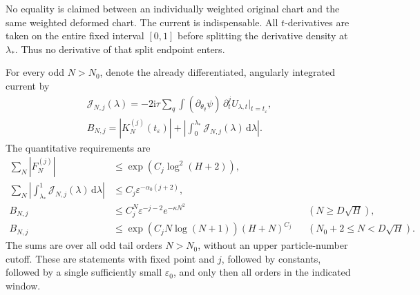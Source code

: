 \documentclass[11pt]{article}
\numberwithin{equation}{section}
\theoremstyle{definition}
\newcommand{\dd}{\,\mathrm d}
\newcommand{\ii}{\mathrm i}
\newcommand{\eps}{\varepsilon}
\begin{document}
No equality is claimed between an individually weighted original chart
and the same weighted deformed chart. The current is indispensable.
All \(t\)-derivatives are taken on the entire fixed interval
\([0,1]\) before splitting the derivative density at \(\lambda_*\).
Thus no derivative of that split endpoint enters.

For every odd $N>N_0$, denote the already differentiated,
angularly integrated current by
\begin{gather*}
 \mathcal J_{N,j}(\lambda)
   =-2\ii\tau\sum_q\int(\partial_{\theta_q}\psi)\,
              \partial_t^j U_{\lambda,t}\big|_{t=t_\eps},\\
 B_{N,j}=|K_N^{(j)}(t_\eps)|
       +\left|\int_0^{\lambda_*}\mathcal J_{N,j}(\lambda)\dd\lambda\right|.
\end{gather*}
The quantitative requirements are
\begin{align}
 \sum_N|F_N^{(j)}|
   &\le \exp(C_j\log^2(H+2)),\label{eq:reqF}\\
 \sum_N\left|\int_{\lambda_*}^1
               \mathcal J_{N,j}(\lambda)\dd\lambda\right|
   &\le C_j\eps^{-\alpha_0(j+2)},\label{eq:reqLS}\\
 B_{N,j}
   &\le C_j^N\eps^{-j-2}e^{-\kappa N^2}
             &&(N\ge D\sqrt H),\label{eq:reqhigh}\\
 B_{N,j}
   &\le \exp(C_jN\log(N+1))(H+N)^{C_j}
             &&(N_0+2\le N<D\sqrt H).\label{eq:reqinter}
\end{align}
The sums are over all odd tail orders \(N>N_0\), without an upper particle-number cutoff.
These are statements with fixed point and \(j\), followed by constants,
followed by a single sufficiently small \(\eps_0\), and only then all
orders in the indicated window.
\end{document}
